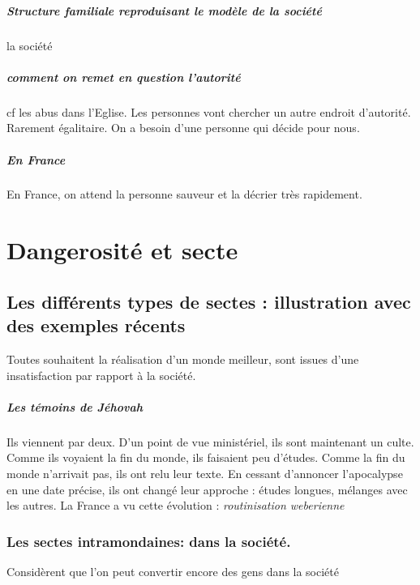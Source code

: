 \paragraph{Structure familiale reproduisant le modèle de la société}  la société

\paragraph{comment on remet en question l'autorité} cf les abus dans l'Eglise. Les personnes vont chercher un autre endroit d'autorité. Rarement égalitaire. On a besoin d'une personne qui décide pour nous. 

\paragraph{En France } En France, on attend la personne sauveur et la décrier très rapidement. 

\chapter{Dangerosité et secte}

\section{Les différents types de sectes : illustration avec des exemples récents}
 
Toutes souhaitent la réalisation d'un monde meilleur, sont issues d'une insatisfaction par rapport à la
société.

\paragraph{Les témoins de Jéhovah} Ils viennent par deux. D'un point de vue ministériel, ils sont maintenant un culte. Comme ils voyaient la fin du monde, ils faisaient peu d'études. Comme la fin du monde n'arrivait pas, ils ont relu leur texte. En cessant d'annoncer l'apocalypse en une date précise, ils ont changé leur approche : études longues, mélanges avec les autres. La France a vu cette évolution : \textit{routinisation weberienne}

\subsection{Les sectes intramondaines: dans la société.}

\begin{Def}
    Considèrent que l'on peut convertir encore des gens dans la société
\end{Def}

